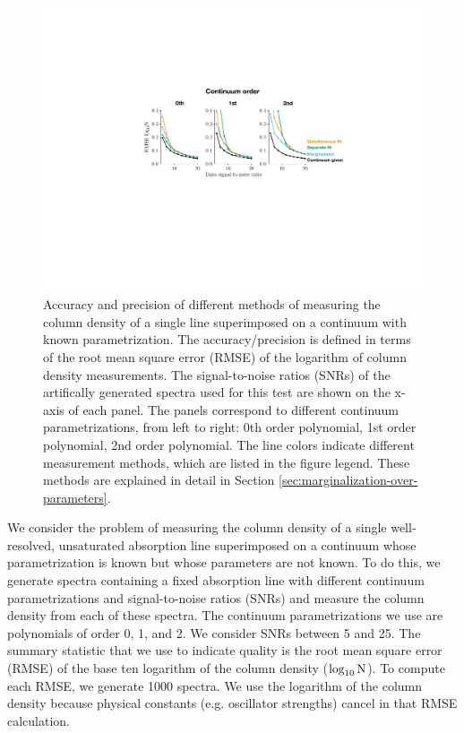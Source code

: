 \documentclass[manuscript]{aastex62}
\begin{document}
\begin{figure}
  \includegraphics[width=\linewidth]{figures/marginalized_unmarginalized_labeled.pdf}
  \caption{
  Accuracy and precision of different methods of measuring the column density of a single line superimposed on a continuum with known parametrization.
  The accuracy/precision is defined in terms of the root mean square error (RMSE) of the logarithm of column density measurements.
  The signal-to-noise ratios (SNRs) of the artifically generated spectra used for this test are shown on the x-axis of each panel.
  The panels correspond to different continuum parametrizations, from left to right: 0th order polynomial, 1st order polynomial, 2nd order polynomial.
  The line colors indicate different measurement methods, which are listed in the figure legend.
  These methods are explained in detail in Section \ref{sec:marginalization-over-parameters}.}
  \label{fig:order-known-comparison}
\end{figure}

We consider the problem of measuring the column density of a single well-resolved, unsaturated absorption line superimposed on a continuum whose parametrization is known but whose parameters are not known.
To do this, we generate spectra containing a fixed absorption line with different continuum parametrizations and signal-to-noise ratios (SNRs) and measure the column density from each of these spectra.
The continuum parametrizations we use are polynomials of order 0, 1, and 2.
We consider SNRs between 5 and 25.
The summary statistic that we use to indicate quality is the root mean square error (RMSE) of the base ten logarithm of the column density ($\log_{10}{\rm N}$).
To compute each RMSE, we generate 1000 spectra.
We use the logarithm of the column density because physical constants (e.g. oscillator strengths) cancel in that RMSE calculation.
\end{document}
